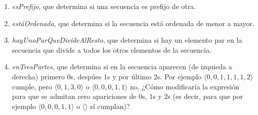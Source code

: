 \begin{enumerate}[label=\alph*)]
      \item \textit{esPrefijo}, que determina si una secuencia es prefijo de otra.


      \item \textit{estáOrdenada}, que determina si la secuencia está ordenada de menor a mayor.


      \item \textit{hayUnoParQueDivideAlResto}, que determina si hay un elemento par en la secuencia que divide a todos los otros elementos de la secuencia.



      \item \textit{enTresPartes}, que determina si en la secuencia aparecen (de izquieda a derecha) primero 0s, despúes 1s y por último 2s. Por ejemplo $\langle 0, 0, 1, 1, 1, 1, 2 \rangle$ cumple, pero $\langle 0, 1, 3, 0 \rangle$ o $\langle 0, 0, 0, 1, 1 \rangle$ no. ¿Cómo modificaría la expresión para que se admitan cero apariciones de 0s, 1s y 2s (es decir, para que por ejemplo $\langle 0, 0, 0, 1, 1 \rangle$ o $\langle \rangle$ sí cumplan)?


\end{enumerate}


